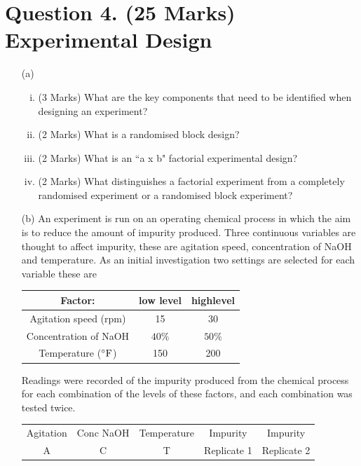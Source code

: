 \documentclass[a4paper,12pt]{article}
\begin{document}
\section*{Question 4. (25 Marks) Experimental Design}
\begin{itemize}
	\item[(a)]
	
	\begin{enumerate}[(i)]
		\item (3 Marks) What are the key components that need to be identified when designing an
		experiment?
		
		\item (2 Marks) What is a randomised block design?
		\item (2 Marks) What is an ``a x b" factorial experimental design?
		\item (2 Marks) What distinguishes a factorial experiment from a completely randomised experiment or a randomised block experiment?
		
		
	\end{enumerate}


		\item[(b)] 
An experiment is run on an operating chemical process in which the aim is to reduce the
amount of impurity produced. Three continuous variables are thought to affect impurity,
these are agitation speed, concentration of NaOH and temperature. As an initial investigation two settings are selected for each variable these are

\begin{center}
	\begin{tabular}{|c|c|c|}
		\hline
		Factor: &low level & highlevel  \\ \hline
		Agitation speed (rpm) & 15 & 30 \\
		Concentration of NaOH & $40\%$ & $50\%$\\
		
		Temperature ($^{\circ}{\rm F}$) & 150 & 200 \\
		\hline
	\end{tabular}
\end{center}
Readings were recorded of the impurity produced from the chemical process for each combination of the levels of these factors, and each combination was tested twice.
\begin{center}
	\begin{tabular}{|c|c|c|c|c|}
		\hline
		Agitation & Conc NaOH &  Temperature & Impurity & Impurity  \\
		A & C & T & Replicate 1 & Replicate 2  \\ \hline


\end{tabular}
\end{center}
\end{itemize}
\end{document}

